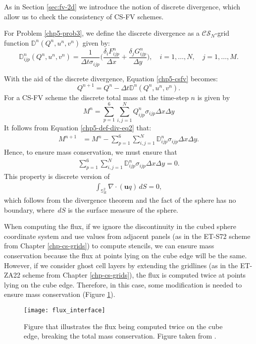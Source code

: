 As in Section \ref{sec:fv-2d}  we introduce the notion of discrete divergence,
which allow us to check the consistency of CS-FV schemes.
\begin{definition}
	\label{chp5-def-div}
	For Problem \ref{chp5-prob3}, we define the discrete divergence as a 
	$\mathcal{CS}_N$-grid function $\mathbb{D}^n(Q^n,u^n,v^n)$
	given by:
	\begin{equation}
		\label{chp5-def-div-eq}
		\mathbb{D}_{ijp}^n(Q^n,u^n,v^n)=  \frac{1}{\Delta t \sigma_{ijp}}
		\bigg(\frac{\delta_i {F}_{ijp}^{n}}{\Delta x} + \frac{\delta_j {G}_{ijp}^{n}}{\Delta y} \bigg), 
		\quad i = 1, \ldots, N, \quad j=1, \ldots,M.
	\end{equation}
\end{definition}
With the aid of the discrete divergence, Equation \eqref{chp5-csfv} becomes:
	\begin{equation}
	\label{chp5-def-div-eq2}
	Q^{n+1} = Q^n - \Delta t \mathbb{D}^n(Q^n,u^n,v^n).
\end{equation}
For a CS-FV scheme the discrete total mass at the time-step $n$ is given by
\begin{equation*}
	M^n =\sum_{p=1}^6 \sum_{i,j=1}^N Q_{ijp}^n \sigma_{ijp} \Delta x \Delta y 
\end{equation*}
It follows from Equation \eqref{chp5-def-div-eq2} that:
\begin{align*}
	M^{n+1} &= M^n  - \sum_{p=1}^6 \sum_{i,j=1}^N \mathbb{D}_{ijp}^{n} \sigma_{ijp} \Delta x \Delta y .
\end{align*}
Hence, to ensure mass conservation, we must ensure that
\begin{align*}
	\sum_{p=1}^6 \sum_{i,j=1}^N   \mathbb{D}_{ijp}^{n} \sigma_{ijp} \Delta x \Delta y = 0.
\end{align*}
This property is discrete version of
\begin{align*}
	\int_{\mathbb{S}^2_R} \nabla \cdot (\boldsymbol{u}q) \,dS = 0,
\end{align*}
which follows from the divergence theorem and the fact of the sphere has no boundary, where $\,dS$ is the surface measure of the sphere.

When computing the flux, if we ignore the discontinuity in the cubed sphere coordinate system and use values from adjacent panels
(as in the ET-S72 scheme from Chapter \ref{chp-cs-grids}) to compute stencils, we can ensure mass conservation because the
flux at points lying on the cube edge will be the same.
However, if we consider ghost cell layers by extending the gridlines (as in the ET-ZA22 scheme from Chapter \ref{chp-cs-grids}),
the flux is computed twice at points lying on the cube edge.
Therefore, in this case, some modification is needed to ensure mass conservation (Figure \ref{chp5-fluxcube}).
\begin{figure}[!htb]
	\centering
	\texttt{[image: flux\_interface]}
	\caption{Figure that illustrates the flux being computed twice on
		the cube edge, breaking the total mass conservation.
		Figure taken from \citet{ross:2006}.\label{chp5-fluxcube}}
\end{figure}

